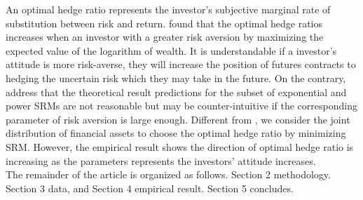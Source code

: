 \documentclass[11pt,a4paper,english]{article}
\begin{document}
An optimal hedge ratio represents the investor's subjective marginal rate of substitution between risk and return. \citet{cecchetti1988estimation} found that the optimal hedge ratios increases when an investor with a greater risk aversion by maximizing the expected value of the logarithm of wealth.
It is understandable if a investor's attitude is more risk-averse, they will increase the position of futures contracts to hedging the uncertain risk which they may take in the future.
On the contrary, \citet{brandtner2015decision} address that the theoretical result predictions for the subset of exponential and power SRMs are not reasonable but may be counter-intuitive if the corresponding parameter of risk aversion is large enough.
Different from \citet{brandtner2015decision}, we consider the joint distribution of financial assets to choose the optimal hedge ratio by minimizing SRM.
However, the empirical result shows the direction of optimal hedge ratio is increasing as the parameters represents the investors' attitude increases. \\


The remainder
of the article is organized as follows. Section 2 methodology. Section 3 data, and Section 4 empirical result. Section 5 concludes.\\












\newpage

\end{document}
